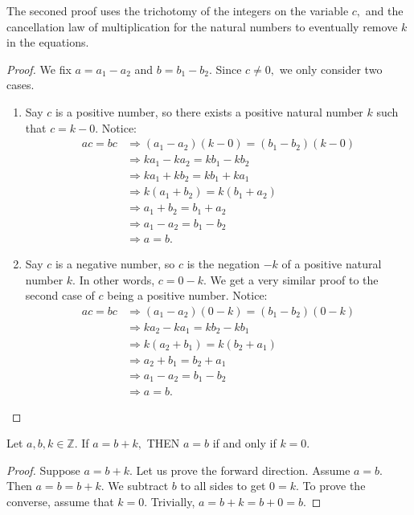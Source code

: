 The seconed proof uses the trichotomy of the integers on the variable $c,$ and the cancellation law of multiplication for the natural numbers to eventually remove $k$ in the equations.
\begin{proof}
	We fix $a = a_1 \minus a_2$ and $b = b_1 \minus b_2.$ Since $c \neq 0,$ we only consider two cases.
	\begin{enumerate}

		\item Say $c$ is a positive number, so there exists a positive natural number $k$ such that $c = k \minus 0.$ Notice:
		\begin{align*}
			ac = bc &\Longrightarrow (a_1 \minus a_2) (k \minus 0) = (b_1 \minus b_2) (k \minus 0) \\
			&\Longrightarrow k a_1 \minus k a_2 = k b_1 \minus k b_2 \\
			&\Longrightarrow k a_1 + k b_2 = k b_1 + k a_1 \\
			&\Longrightarrow k(a_1 + b_2) = k(b_1 + a_2) \\
			&\Longrightarrow a_1 + b_2 = b_1 + a_2 \\
			&\Longrightarrow a_1 \minus a_2 = b_1 \minus b_2 \\
			&\Longrightarrow a = b.
		\end{align*}
	\item Say $c$ is a negative number, so $c$ is the negation $-k$ of a positive natural number $k.$
	In other words, $c = 0 \minus k.$ We get a very similar proof to the second case of $c$ being a positive number. Notice:
	\begin{align*}
		ac = bc &\Longrightarrow (a_1 \minus a_2) (0 \minus k) = (b_1 \minus b_2) (0 \minus k) \\
		&\Longrightarrow k a_2 \minus k a_1 = k b_2 \minus k b_1 \\
		&\Longrightarrow k(a_2 + b_1) = k (b_2 + a_1) \\
		&\Longrightarrow a_2 + b_1 = b_2 + a_1 \\
		&\Longrightarrow a_1 \minus a_2 = b_1 \minus b_2 \\
		&\Longrightarrow a = b.
	\end{align*}
	\end{enumerate}
\end{proof}

\begin{lemma}\label{lem:k_zero}
	Let $a, b, k \in \mathbb{Z}.$ If $a = b + k,$ THEN $a = b$ if and only if $k = 0.$
\end{lemma}
\begin{proof}
	Suppose $a = b + k.$ Let us prove the forward direction. 
	Assume $a = b.$ Then $a = b = b +k.$ 
	We subtract $b$ to all sides to get $0 = k.$
	To prove the converse, assume that $k=0.$ Trivially, $a = b + k = b + 0 = b.$
\end{proof}

